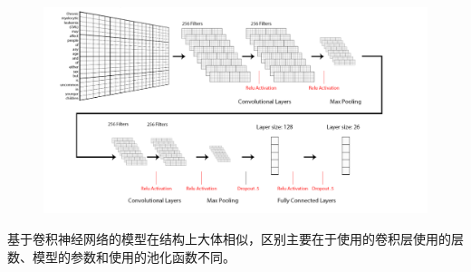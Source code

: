 \documentclass[UTF8]{ctexart}
\begin{document}
	\begin{figure}[H]
		\centering \includegraphics[width=0.5\textheight]{medicalCNN}
	\end{figure}
	\par 基于卷积神经网络的模型在结构上大体相似，区别主要在于使用的卷积层使用的层数、模型的参数和使用的池化函数不同。
	
\end{document}
